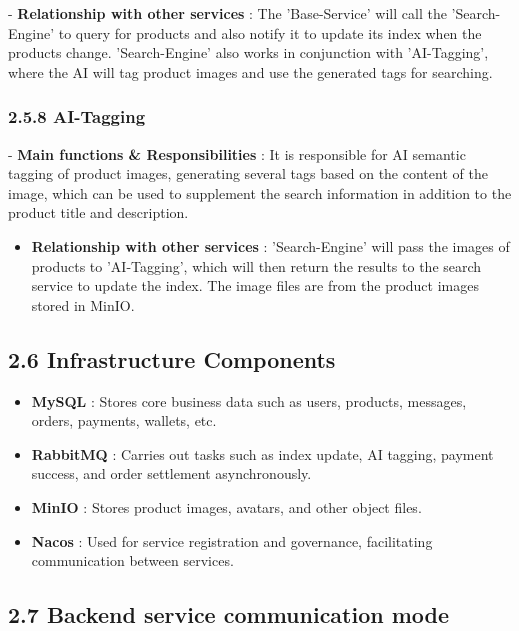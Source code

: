 \documentclass{article}
\begin{document}
-\textbf{ Relationship with other services } : The 'Base-Service' will call the 'Search-Engine' to query for products and also notify it to update its index when the products change. 'Search-Engine' also works in conjunction with 'AI-Tagging', where the AI will tag product images and use the generated tags for searching.

\subsubsection{2.5.8 AI-Tagging}

-\textbf{ Main functions \& Responsibilities } : It is responsible for AI semantic tagging of product images, generating several tags based on the content of the image, which can be used to supplement the search information in addition to the product title and description.

\begin{itemize}
    \item \textbf{ Relationship with other services } : 'Search-Engine' will pass the images of products to 'AI-Tagging', which will then return the results to the search service to update the index. The image files are from the product images stored in MinIO.
\end{itemize}

\subsection{2.6 Infrastructure Components}

\begin{itemize}
    \item \textbf{MySQL} : Stores core business data such as users, products, messages, orders, payments, wallets, etc.
    \item \textbf{RabbitMQ} : Carries out tasks such as index update, AI tagging, payment success, and order settlement asynchronously.
    \item \textbf{MinIO} : Stores product images, avatars, and other object files.
    \item \textbf{Nacos} : Used for service registration and governance, facilitating communication between services.
\end{itemize}

\subsection{2.7 Backend service communication mode}
\end{document}

